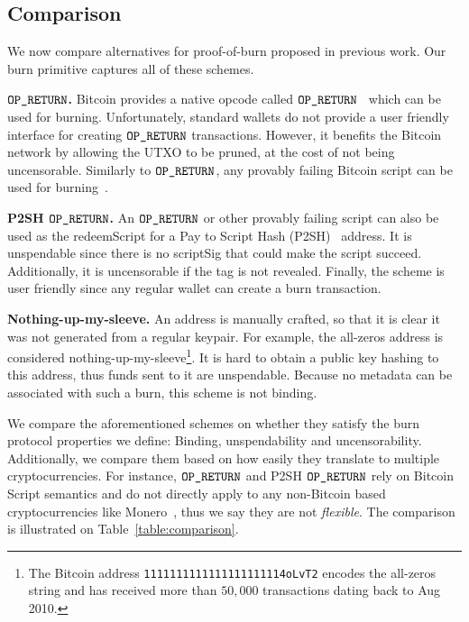 \subsection{Comparison}

We now compare alternatives for proof-of-burn proposed in previous work. Our burn primitive captures all of these schemes.

\newcommand{\opreturn}{\texttt{OP\_RE\-TURN}}

\noindent
\textbf{$\opreturn$.}
Bitcoin provides a native opcode called  $\opreturn$~\cite{opreturn} which can be used for burning.
Unfortunately,
standard wallets do not provide a user friendly interface for creating $\opreturn$ transactions.
However, it benefits the Bitcoin network by allowing the UTXO to be pruned, at
the cost of not being uncensorable.
Similarly to $\opreturn$, any provably failing Bitcoin script can be used for
burning~\cite{stewart}.

\noindent
\textbf{P2SH $\opreturn$.}
An $\opreturn$ or other provably failing script can also be used as the redeemScript for a Pay to Script Hash (P2SH)~\cite{p2sh} address. It is unspendable since there is no scriptSig that could make the script succeed. Additionally, it is uncensorable if the tag is not revealed. Finally, the scheme is user friendly since any regular wallet can create a burn transaction.

\noindent
\textbf{Nothing-up-my-sleeve.}
An address is manually crafted, so that it is clear it was not generated from a regular keypair. For example, the all-zeros address is considered nothing-up-my-sleeve\footnote{The Bitcoin address \texttt{1111111111111111111114oLvT2} encodes the all-zeros string and has received more than $50{,}000$ transactions dating back to Aug 2010.}. It is hard to obtain a public key hashing to this address, thus funds sent to it are unspendable. Because no metadata can be associated with such a burn, this scheme is not binding.

We compare the aforementioned schemes on whether they satisfy the burn protocol properties we define: Binding, unspendability and uncensorability. Additionally, we compare them based on how easily they translate to multiple cryptocurrencies. For instance, $\opreturn$ and P2SH $\opreturn$ rely on Bitcoin Script semantics and do not directly apply to any non-Bitcoin based cryptocurrencies like Monero~\cite{cryptonote}, thus we say they are not \emph{flexible}. The comparison is illustrated on Table~\ref{table:comparison}.

